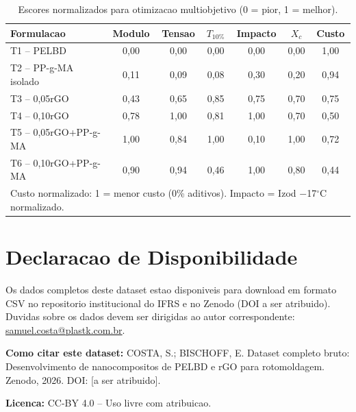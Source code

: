 \documentclass[11pt,a4paper]{article}
\begin{document}
\begin{table}[H]\centering
\caption{Escores normalizados para otimizacao multiobjetivo (0 = pior, 1 = melhor).}\label{tab:escores}
\begin{tabular}{lcccccc}
\toprule
{\bfseries Formulacao} & {\bfseries Modulo} & {\bfseries Tensao} & {\bfseries $T_{10\%}$} & {\bfseries Impacto} & {\bfseries $X_c$} & {\bfseries Custo} \\
\midrule
T1 -- PELBD           & 0,00 & 0,00 & 0,00 & 0,00 & 0,00 & 1,00 \\
T2 -- PP-g-MA isolado & 0,11 & 0,09 & 0,08 & 0,30 & 0,20 & 0,94 \\
T3 -- 0,05rGO         & 0,43 & 0,65 & 0,85 & 0,75 & 0,70 & 0,75 \\
T4 -- 0,10rGO         & 0,78 & 1,00 & 0,81 & 1,00 & 0,70 & 0,50 \\
T5 -- 0,05rGO+PP-g-MA & 1,00 & 0,84 & 1,00 & 0,10 & 1,00 & 0,72 \\
T6 -- 0,10rGO+PP-g-MA & 0,90 & 0,94 & 0,46 & 1,00 & 0,80 & 0,44 \\
\bottomrule
\multicolumn{7}{l}{Custo normalizado: 1 = menor custo (0\% aditivos). Impacto = Izod $-$17$^{\circ}$C normalizado.} \\
\end{tabular}
\end{table}

\section{Declaracao de Disponibilidade}

Os dados completos deste dataset estao disponiveis para download em formato CSV no repositorio institucional do IFRS e no Zenodo (DOI a ser atribuido). Duvidas sobre os dados devem ser dirigidas ao autor correspondente: \href{mailto:samuel.costa@plastk.com.br}{samuel.costa@plastk.com.br}.

\vspace{12pt}
{\bfseries Como citar este dataset:} COSTA, S.; BISCHOFF, E. Dataset completo bruto: Desenvolvimento de nanocompositos de PELBD e rGO para rotomoldagem. Zenodo, 2026. DOI: [a ser atribuido].

\vspace{12pt}
{\bfseries Licenca:} CC-BY 4.0 -- Uso livre com atribuicao.
\end{document}
